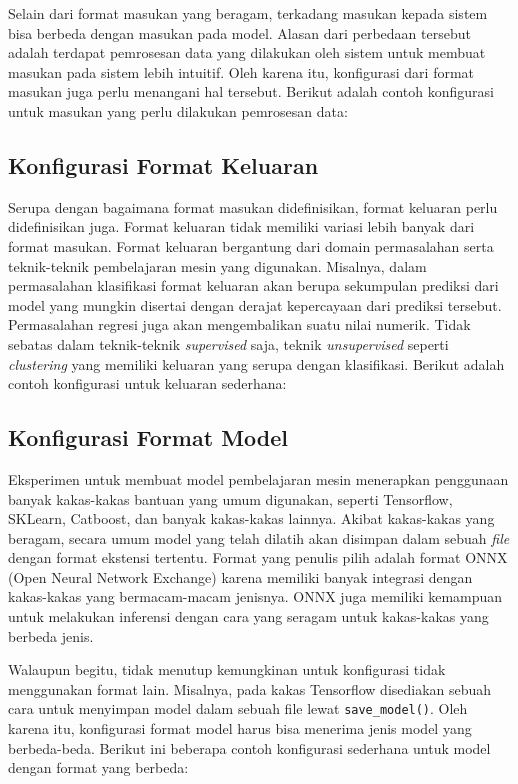 Selain dari format masukan yang beragam, terkadang masukan kepada sistem bisa berbeda dengan masukan pada model.
Alasan dari perbedaan tersebut adalah terdapat pemrosesan data yang dilakukan oleh sistem untuk membuat masukan pada sistem lebih intuitif.
Oleh karena itu, konfigurasi dari format masukan juga perlu menangani hal tersebut.
Berikut adalah contoh konfigurasi untuk masukan yang perlu dilakukan pemrosesan data:


\subsection{Konfigurasi Format Keluaran}\label{section:03-output-format}
Serupa dengan bagaimana format masukan didefinisikan, format keluaran perlu didefinisikan juga.
Format keluaran tidak memiliki variasi lebih banyak dari format masukan.
Format keluaran bergantung dari domain permasalahan serta teknik-teknik pembelajaran mesin yang digunakan.
Misalnya, dalam permasalahan klasifikasi format keluaran akan berupa sekumpulan prediksi dari model yang mungkin disertai dengan derajat kepercayaan dari prediksi tersebut.
Permasalahan regresi juga akan mengembalikan suatu nilai numerik.
Tidak sebatas dalam teknik-teknik \textit{supervised} saja, teknik \textit{unsupervised} seperti \textit{clustering} yang memiliki keluaran yang serupa dengan klasifikasi.
Berikut adalah contoh konfigurasi untuk keluaran sederhana:


\subsection{Konfigurasi Format Model}\label{section:03-model-format}
Eksperimen untuk membuat model pembelajaran mesin menerapkan penggunaan banyak kakas-kakas bantuan yang umum digunakan, seperti Tensorflow, SKLearn, Catboost, dan banyak kakas-kakas lainnya.
Akibat kakas-kakas yang beragam, secara umum model yang telah dilatih akan disimpan dalam sebuah \textit{file} dengan format ekstensi tertentu.
Format yang penulis pilih adalah format ONNX (Open Neural Network Exchange) karena memiliki banyak integrasi dengan kakas-kakas yang bermacam-macam jenisnya.
ONNX juga memiliki kemampuan untuk melakukan inferensi dengan cara yang seragam untuk kakas-kakas yang berbeda jenis.

Walaupun begitu, tidak menutup kemungkinan untuk konfigurasi tidak menggunakan format lain.
Misalnya, pada kakas Tensorflow disediakan sebuah cara untuk menyimpan model dalam sebuah file lewat \texttt{save_model()}.
Oleh karena itu, konfigurasi format model harus bisa menerima jenis model yang berbeda-beda.
Berikut ini beberapa contoh konfigurasi sederhana untuk model dengan format yang berbeda:


